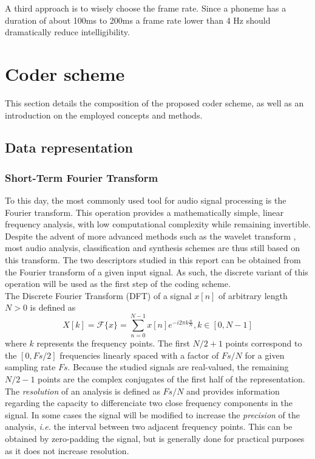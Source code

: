 \documentclass[12pt,times,onecolumn]{article}
\begin{document}
A third approach is to wisely choose the frame rate. Since a phoneme has a duration of about 100ms to 200ms \cite{kuwabara1996acoustic} \cite{rosen1992temporal} a frame rate lower than 4 Hz should dramatically reduce intelligibility.


\section{Coder scheme}

This section details the composition of the proposed coder scheme, as well as an introduction on the employed concepts and methods.

\subsection{Data representation}
\subsubsection{Short-Term Fourier Transform}
\label{stft}
To this day, the most commonly used tool for audio signal processing is the Fourier transform. This operation provides a mathematically simple, linear frequency analysis, with low computational complexity while remaining invertible. Despite the advent of more advanced methods such as the wavelet transform \cite{bentley1994}, most audio analysis, classification and synthesis schemes are thus still based on this transform. The two descriptors studied in this report can be obtained from the Fourier transform of a given input signal. As such, the discrete variant of this operation will be used as the first step of the coding scheme.\\

The Discrete Fourier Transform (DFT) of a signal $x[n]$ of arbitrary length $N>0$ is defined as
\begin{equation}
X[k] = \mathcal{F}\{x\} = \sum\limits_{n = 0}^{N-1} x[n]e^{-i2\pi k\frac{n}{N}}, k\in [0, N-1]
\end{equation}
where $k$ represents the frequency points. The first $N/2+1$ points correspond to the $[0, Fs/2]$ frequencies linearly spaced with a factor of $Fs/N$ for a given sampling rate $Fs$. Because the studied signals are real-valued, the remaining $N/2-1$ points are the complex conjugates of the first half of the representation. The \textit{resolution} of an analysis is defined as $Fs/N$ and provides information regarding the capacity to differenciate two close frequency components in the signal. In some cases the signal will be modified to increase the \textit{precision} of the analysis, \textit{i.e.} the interval between two adjacent frequency points. This can be obtained by zero-padding the signal, but is generally done for practical purposes as it does not increase resolution.
\end{document}
